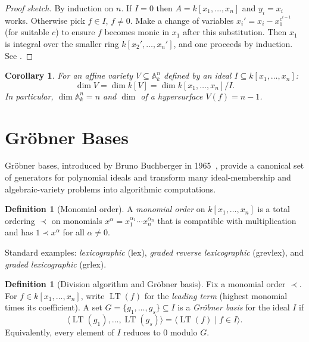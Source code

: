 \documentclass[12pt,a4paper]{amsart}
\newtheorem{corollary}[theorem]{Corollary}
\theoremstyle{definition}
\newtheorem{definition}[theorem]{Definition}
\theoremstyle{definition}
\begin{document}
\begin{proof}[Proof sketch]
By induction on $n$. If $I = 0$ then $A = k[x_1,\ldots,x_n]$ and $y_i = x_i$ works.
Otherwise pick $f \in I$, $f \neq 0$. Make a change of variables $x_i' = x_i - x_1^{c^{i-1}}$
(for suitable $c$) to ensure $f$ becomes monic in $x_1$ after this substitution.
Then $x_1$ is integral over the smaller ring $k[x_2',\ldots,x_n']$, and one proceeds
by induction. See \cite[Thm.~5.10]{AtiyahMacdonald1969}.
\end{proof}

\begin{corollary}
For an affine variety $V \subseteq \mathbb{A}^n_k$ defined by an ideal $I \subseteq k[x_1,\ldots,x_n]$:
\[
  \dim V = \dim k[V] = \dim k[x_1,\ldots,x_n]/I.
\]
In particular, $\dim \mathbb{A}^n_k = n$ and $\dim$ of a hypersurface $V(f) = n-1$.
\end{corollary}

\section{Gröbner Bases}\label{sec:groebner}

Gröbner bases, introduced by Bruno Buchberger in 1965~\cite{Buchberger1970},
provide a canonical set of generators for polynomial ideals and transform many
ideal-membership and algebraic-variety problems into algorithmic computations.

\begin{definition}[Monomial order]
A \emph{monomial order} on $k[x_1,\ldots,x_n]$ is a total ordering $\prec$ on
monomials $x^\alpha = x_1^{\alpha_1}\cdots x_n^{\alpha_n}$ that is compatible with
multiplication and has $1 \prec x^\alpha$ for all $\alpha \neq 0$.

Standard examples: \emph{lexicographic} (lex), \emph{graded reverse lexicographic} (grevlex),
and \emph{graded lexicographic} (grlex).
\end{definition}

\begin{definition}[Division algorithm and Gröbner basis]
Fix a monomial order $\prec$. For $f \in k[x_1,\ldots,x_n]$, write $\operatorname{LT}(f)$
for the \emph{leading term} (highest monomial times its coefficient).
A set $G = \{g_1,\ldots,g_s\} \subseteq I$ is a \emph{Gröbner basis} for the ideal
$I$ if
\[
  \langle \operatorname{LT}(g_1), \ldots, \operatorname{LT}(g_s) \rangle
  = \langle \operatorname{LT}(f) \mid f \in I \rangle.
\]
Equivalently, every element of $I$ reduces to $0$ modulo $G$.
\end{definition}
\end{document}
